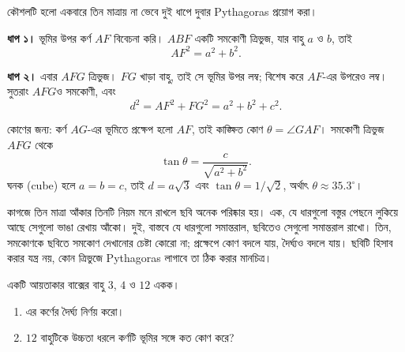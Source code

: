 \documentclass[11pt]{article}
\begin{document}
\begin{solbox}
\begin{center}
\end{center}

কৌশলটি হলো একবারে তিন মাত্রায় না ভেবে দুই ধাপে দুবার Pythagoras প্রয়োগ করা।

\textbf{ধাপ ১।} ভূমির উপর কর্ণ $AF$ বিবেচনা করি। $ABF$ একটি সমকোণী ত্রিভুজ,
যার বাহু $a$ ও $b$, তাই
\[
  AF^{2} = a^{2} + b^{2} .
\]

\textbf{ধাপ ২।} এবার $AFG$ ত্রিভুজ। $FG$ খাড়া বাহু, তাই সে ভূমির উপর লম্ব;
বিশেষ করে $AF$-এর উপরেও লম্ব। সুতরাং $AFG$ও সমকোণী, এবং
\[
  d^{2} = AF^{2} + FG^{2} = a^{2} + b^{2} + c^{2} .
\]

কোণের জন্য: কর্ণ $AG$-এর ভূমিতে প্রক্ষেপ হলো $AF$, তাই কাঙ্ক্ষিত কোণ $\theta =
\angle GAF$। সমকোণী ত্রিভুজ $AFG$ থেকে
\[
  \tan \theta = \frac{c}{\sqrt{a^{2}+b^{2}}} .
\]
ঘনক (cube) হলে $a = b = c$, তাই $d = a\sqrt{3}$ এবং
$\tan\theta = 1/\sqrt{2}$, অর্থাৎ $\theta \approx 35.3^{\circ}$।
\end{solbox}

\begin{remark}
কাগজে তিন মাত্রা আঁকার তিনটি নিয়ম মনে রাখলে ছবি অনেক পরিষ্কার হয়। এক, যে ধারগুলো
বস্তুর পেছনে লুকিয়ে আছে সেগুলো ভাঙা রেখায় আঁকো। দুই, বাস্তবে যে ধারগুলো
সমান্তরাল, ছবিতেও সেগুলো সমান্তরাল রাখো। তিন, সমকোণকে ছবিতে সমকোণ দেখানোর চেষ্টা
কোরো না; প্রক্ষেপে কোণ বদলে যায়, দৈর্ঘ্যও বদলে যায়। ছবিটি হিসাব করার যন্ত্র নয়,
কোন ত্রিভুজে Pythagoras লাগাবে তা ঠিক করার মানচিত্র।
\end{remark}

 একটি আয়তাকার বাক্সের বাহু $3$, $4$ ও $12$ একক।
\begin{enumerate}
  \item এর কর্ণের দৈর্ঘ্য নির্ণয় করো।
  \item $12$ বাহুটিকে উচ্চতা ধরলে কর্ণটি ভূমির সঙ্গে কত কোণ করে?
\end{enumerate}
\end{document}
